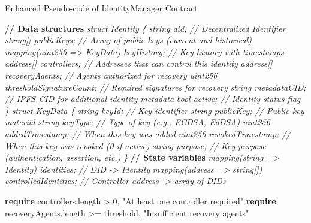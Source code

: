 \documentclass[lettersize,journal]{IEEEtran}
\begin{document}
\begin{itemize}
\begin{algorithm}[H]
\caption{Enhanced Pseudo-code of IdentityManager Contract}
\begin{algorithmic}[1]
\Statex \textbf{// Data structures}
\Statex \textit{struct Identity \{}
\Statex \hspace{\algorithmicindent} \textit{string did; // Decentralized Identifier}
\Statex \hspace{\algorithmicindent} \textit{string[] publicKeys; // Array of public keys (current and historical)}
\Statex \hspace{\algorithmicindent} \textit{mapping(uint256 => KeyData) keyHistory; // Key history with timestamps}
\Statex \hspace{\algorithmicindent} \textit{address[] controllers; // Addresses that can control this identity}
\Statex \hspace{\algorithmicindent} \textit{address[] recoveryAgents; // Agents authorized for recovery}
\Statex \hspace{\algorithmicindent} \textit{uint256 thresholdSignatureCount; // Required signatures for recovery}
\Statex \hspace{\algorithmicindent} \textit{string metadataCID; // IPFS CID for additional identity metadata}
\Statex \hspace{\algorithmicindent} \textit{bool active; // Identity status flag}
\Statex \textit{\}}
\Statex 
\Statex \textit{struct KeyData \{}
\Statex \hspace{\algorithmicindent} \textit{string keyId; // Key identifier}
\Statex \hspace{\algorithmicindent} \textit{string publicKey; // Public key material}
\Statex \hspace{\algorithmicindent} \textit{string keyType; // Type of key (e.g., ECDSA, EdDSA)}
\Statex \hspace{\algorithmicindent} \textit{uint256 addedTimestamp; // When this key was added}
\Statex \hspace{\algorithmicindent} \textit{uint256 revokedTimestamp; // When this key was revoked (0 if active)}
\Statex \hspace{\algorithmicindent} \textit{string purpose; // Key purpose (authentication, assertion, etc.)}
\Statex \textit{\}}
\Statex 
\Statex \textbf{// State variables}
\Statex \textit{mapping(string => Identity) identities; // DID -> Identity}
\Statex \textit{mapping(address => string[]) controlledIdentities; // Controller address -> array of DIDs}
\Statex 

    \State \textbf{require} controllers.length > 0, "At least one controller required"
    \State \textbf{require} recoveryAgents.length >= threshold, "Insufficient recovery agents"
    

\end{algorithmic}
\end{algorithm}
\end{itemize}
\end{document}
